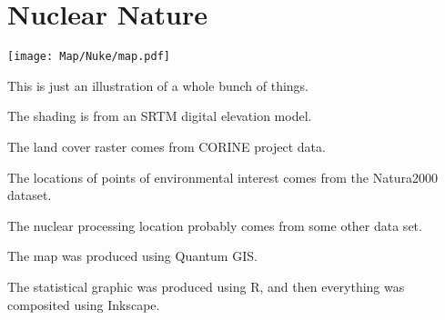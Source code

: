 

\section{Nuclear Nature}

\begin{marginfigure}
\texttt{[image: Map/Nuke/map.pdf]}
\end{marginfigure}

This is just an illustration of a whole bunch of things.

The shading is from an SRTM digital elevation model.

The land cover raster comes from CORINE project data.

The locations of points of environmental interest comes from the Natura2000 dataset.

The nuclear processing location probably comes from some other data set.

The map was produced using Quantum GIS.

The statistical graphic was produced using R, and then everything was 
composited using Inkscape.

